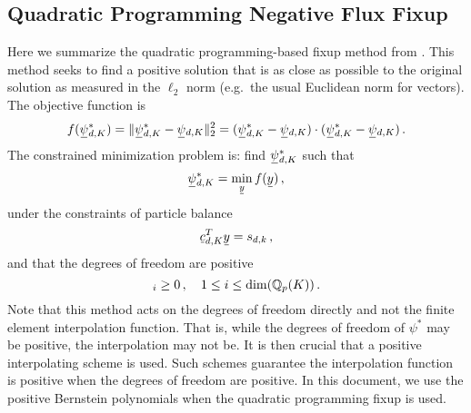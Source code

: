 \documentclass[../doc.tex]{subfiles}
\begin{document}
\subsection{Quadratic Programming Negative Flux Fixup} \label{sn_sec:qp}
Here we summarize the quadratic programming-based fixup method from \textcite{YEE2020109696}. This method seeks to find a positive solution that is as close as possible to the original solution as measured in the $\ell_2$ norm (e.g.~the usual Euclidean norm for vectors). The objective function is 
	\begin{equation}
		f(\ubar{\psi}_{d,K}^*) = \| \ubar{\psi}_{d,K}^* - \ubar{\psi}_{d,K} \|_2^2 = (\ubar{\psi}_{d,K}^* - \ubar{\psi}_{d,K}) \cdot (\ubar{\psi}_{d,K}^* - \ubar{\psi}_{d,K}) \,. 
	\end{equation}
The constrained minimization problem is: find $\ubar{\psi}_{d,K}^*$ such that 
	\begin{equation}
		\ubar{\psi}_{d,K}^* = \min_{\ubar{y}} f(\ubar{y}) \,, 
	\end{equation}
under the constraints of particle balance 
	\begin{equation}
		\ubar{c}_{d,K}^T \ubar{y} = s_{d,k} \,,
	\end{equation}
and that the degrees of freedom are positive
	\begin{equation}
		[\ubar{y}]_i \geq 0 \,, \quad 1 \leq i \leq \dim(\Qbb{p}(K)) \,. 
	\end{equation}
Note that this method acts on the degrees of freedom directly and not the finite element interpolation function. That is, while the degrees of freedom of $\psi^*$ may be positive, the interpolation may not be. It is then crucial that a positive interpolating scheme is used. Such schemes guarantee the interpolation function is positive when the degrees of freedom are positive. In this document, we use the positive Bernstein polynomials \cite{doi:10.1137/11082539X} when the quadratic programming fixup is used. 
\end{document}
